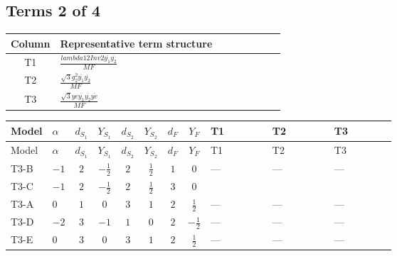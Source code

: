 \documentclass[8pt]{article}
\begin{document}
\begin{landscape}
\subsection*{Terms 2 of 4}
\begin{center}
\begin{tabular}{@{}c >{\raggedright\arraybackslash}p{0.82\linewidth}@{}}
\toprule
Column & Representative term structure \\
\midrule
T1 & \(\displaystyle \frac{lambda12Inv2 \overline{y_{1}} \overline{y_{2}}}{MF}\) \\
\midrule
T2 & \(\displaystyle \frac{\sqrt{3} g_{2}^{2} \overline{y_{1}} \overline{y_{2}}}{MF}\) \\
\midrule
T3 & \(\displaystyle \frac{\sqrt{3} ye \overline{y_{1}} \overline{y_{2}} \overline{ye}}{MF}\) \\
\midrule
\bottomrule
\end{tabular}
\end{center}
\smallskip
\tiny
\begin{longtable}{@{}llcccccc >{\raggedright\arraybackslash}p{0.21\linewidth} >{\raggedright\arraybackslash}p{0.21\linewidth} >{\raggedright\arraybackslash}p{0.21\linewidth}@{}}
\toprule
Model & $\alpha$ & $d_{S_1}$ & $Y_{S_1}$ & $d_{S_2}$ & $Y_{S_2}$ & $d_F$ & $Y_F$ & T1 & T2 & T3 \\
\midrule
\endfirsthead
\toprule
Model & $\alpha$ & $d_{S_1}$ & $Y_{S_1}$ & $d_{S_2}$ & $Y_{S_2}$ & $d_F$ & $Y_F$ & T1 & T2 & T3 \\
\midrule
\endhead
T3-B & $-1$ & $2$ & $-\frac{1}{2}$ & $2$ & $\frac{1}{2}$ & $1$ & $0$ & --- & --- & --- \\
\midrule
T3-C & $-1$ & $2$ & $-\frac{1}{2}$ & $2$ & $\frac{1}{2}$ & $3$ & $0$ & \scriptsize\adjustbox{max width=\linewidth}{$\begin{gathered} - \frac{lambda12Inv2 \overline{y_{1}} \overline{y_{2}}}{3 MF}\end{gathered}$} & \scriptsize\adjustbox{max width=\linewidth}{$\begin{gathered} - \frac{\sqrt{3} g_{2}^{2} \overline{y_{1}} \overline{y_{2}}}{4 MF}\end{gathered}$} & \scriptsize\adjustbox{max width=\linewidth}{$\begin{gathered} \frac{\sqrt{3} ye \overline{y_{1}} \overline{y_{2}} \overline{ye}}{12 MF}\end{gathered}$} \\
\midrule
T3-A & $0$ & $1$ & $0$ & $3$ & $1$ & $2$ & $\frac{1}{2}$ & --- & --- & --- \\
\midrule
T3-D & $-2$ & $3$ & $-1$ & $1$ & $0$ & $2$ & $-\frac{1}{2}$ & --- & --- & --- \\
\midrule
T3-E & $0$ & $3$ & $0$ & $3$ & $1$ & $2$ & $\frac{1}{2}$ & --- & --- & --- \\
\midrule
\bottomrule
\end{longtable}
\clearpage

\end{landscape}
\end{document}
